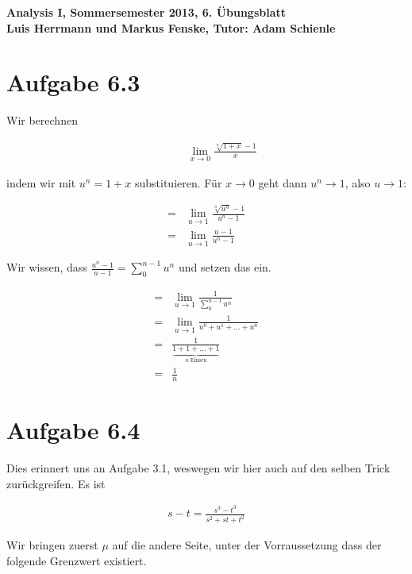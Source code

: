 \documentclass[a4paper,german,12pt,smallheadings]{scrartcl}
\begin{document}
\begin{center}
\bfseries %
\sffamily %
\vspace{-40pt}
Analysis I, Sommersemester 2013, 6. Übungsblatt \\
Luis Herrmann und Markus Fenske, Tutor: Adam Schienle
\vspace{-10pt}
\end{center}

\section*{Aufgabe 6.3}

Wir berechnen

\begin{align*}
  \qquad&\lim_{x \to 0} \frac{\sqrt[n]{1+x} - 1}{x}
\end{align*}

indem wir mit $u^n = 1+x$ substituieren. Für $x \to 0$ geht dann $u^n \to 1$, also $u \to 1$:

\begin{align*}
  = &\lim_{u \to 1} \frac{\sqrt[n]{u^n} - 1}{u^n -1} \\
  = &\lim_{u \to 1} \frac{u - 1}{u^n -1}
\end{align*}

Wir wissen, dass $\frac{u^n-1}{u-1} = \sum_0^{n-1} u^n$ und setzen das ein.

\begin{align*}
  = &\lim_{u \to 1} \frac{1}{\sum_0^{n-1} u^n} \\
  = &\lim_{u \to 1} \frac{1}{u^0 + u^1 + \dots + u^n} \\
  = &\frac{1}{\underbrace{1 + 1 + \dots + 1}_{n\;\text{Einsen}}} \\
  = &\frac{1}{n}
\end{align*}

\section*{Aufgabe 6.4}

Dies erinnert uns an Aufgabe 3.1, weswegen wir hier auch auf den selben Trick
zurückgreifen. Es ist

\begin{align*}
  s - t = \frac{s^3 - t^3}{s^2 + st + t^2}
\end{align*}

Wir bringen zuerst $\mu$ auf die andere Seite, unter der Vorraussetzung dass
der folgende Grenzwert existiert.
\end{document}
